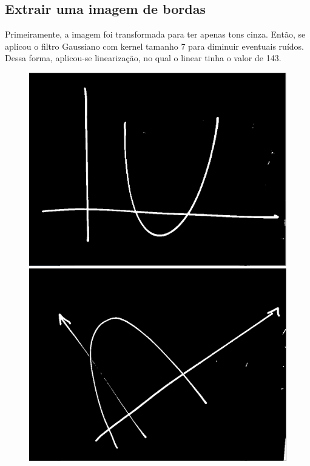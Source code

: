 \documentclass{article}
\begin{document}
   \subsection{Extrair uma imagem de bordas}
   Primeiramente, a imagem foi transformada para ter apenas tons cinza. Então, se aplicou o filtro Gaussiano com kernel tamanho 7 para diminuir eventuais ruídos. Dessa forma, aplicou-se linearização, no qual o linear tinha o valor de 143.
   \begin{figure}[h!]
   \centering
    \subfigure
        {\includegraphics[scale=0.17]{exemplo1_edge.PNG}}
    \subfigure
        {\includegraphics[scale=0.17]{exemplo2_edge.PNG}}
    \subfigure

\end{figure}
\end{document}
